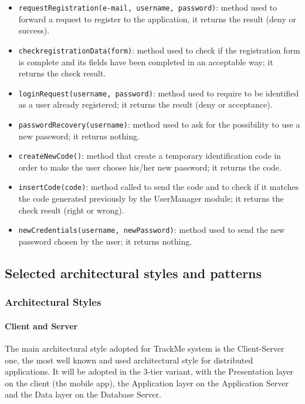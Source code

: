 \begin{itemize}
\item[ ]\texttt{requestRegistration(e-mail, username, password)}: method used to forward a request to register to the application, it returns the result (deny or success).

\item[ ]\texttt{checkregistrationData(form)}: method used to check if the registration form is complete and its fields have been completed in an acceptable way; it returns the check result.

\item[ ]\texttt{loginRequest(username, password)}: method used to require to be identified as a user already registered; it returns the result (deny or acceptance).

\item[ ]\texttt{passwordRecovery(username)}: method used to ask for the possibility to use a new password; it returns nothing.

\item[ ]\texttt{createNewCode()}: method that create a temporary identification code in order to make the user choose his/her new password; it returns the code.

\item[ ]\texttt{insertCode(code)}: method called to send the code and to check if it matches the code generated previously by the UserManager module; it returns the check result (right or wrong).

\item[ ]\texttt{newCredentials(username, newPassword)}: method used to send the new password chosen by the user; it returns nothing.
\end{itemize}

\subsection{Selected architectural styles and patterns}
\subsubsection{Architectural Styles}
\paragraph*{Client and Server}
The main architectural style adopted for TrackMe system is the Client-Server one, the most well known and used architectural style for distributed applications. It will be adopted in the 3-tier variant, with the Presentation layer on the client (the mobile app), the Application layer on the Application Server and the Data layer on the Database Server.

